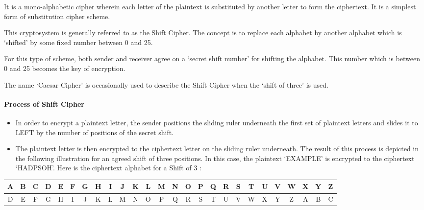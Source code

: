\documentclass[british]{article}
\providecommand{\tabularnewline}{\\}
\begin{document}
It is a mono-alphabetic cipher wherein each letter of the plaintext
is substituted by another letter to form the ciphertext. It is a simplest
form of substitution cipher scheme.

This cryptosystem is generally referred to as the Shift Cipher. The
concept is to replace each alphabet by another alphabet which is \textquoteleft shifted\textquoteright{}
by some fixed number between 0 and 25.

For this type of scheme, both sender and receiver agree on a \textquoteleft secret
shift number\textquoteright{} for shifting the alphabet. This number
which is between 0 and 25 becomes the key of encryption.

The name \textquoteleft Caesar Cipher\textquoteright{} is occasionally
used to describe the Shift Cipher when the \textquoteleft shift of
three\textquoteright{} is used.

\paragraph*{Process of Shift Cipher}
\begin{itemize}
\item In order to encrypt a plaintext letter, the sender positions the sliding
ruler underneath the first set of plaintext letters and slides it
to LEFT by the number of positions of the secret shift.
\item The plaintext letter is then encrypted to the ciphertext letter on
the sliding ruler underneath. The result of this process is depicted
in the following illustration for an agreed shift of three positions.
In this case, the plaintext \textquoteleft EXAMPLE\textquoteright{}
is encrypted to the ciphertext \textquoteleft HADPSOH\textquoteright .
Here is the ciphertext alphabet for a Shift of 3 :
\end{itemize}
\begin{center}
\begin{tabular}{|c|c|c|c|c|c|c|c|c|c|c|c|c|c|c|c|c|c|c|c|c|c|c|c|c|c|}
\hline 
{\small{}A} & {\small{}B} & {\small{}C} & {\small{}D} & {\small{}E} & {\small{}F} & {\small{}G} & {\small{}H} & {\small{}I} & {\small{}J} & {\small{}K} & {\small{}L} & {\small{}M} & {\small{}N} & {\small{}O} & {\small{}P} & {\small{}Q} & {\small{}R} & {\small{}S} & {\small{}T} & {\small{}U} & {\small{}V} & {\small{}W} & {\small{}X} & {\small{}Y} & {\small{}Z}\tabularnewline
\hline 
\hline 
{\small{}D} & {\small{}E} & {\small{}F} & {\small{}G} & {\small{}H} & {\small{}I} & {\small{}J} & {\small{}K} & {\small{}L} & {\small{}M} & {\small{}N} & {\small{}O} & {\small{}P} & {\small{}Q} & {\small{}R} & {\small{}S} & {\small{}T} & {\small{}U} & {\small{}V} & {\small{}W} & {\small{}X} & {\small{}Y} & {\small{}Z} & {\small{}A} & {\small{}B} & {\small{}C}\tabularnewline
\hline 
\end{tabular}
\par\end{center}
\end{document}

